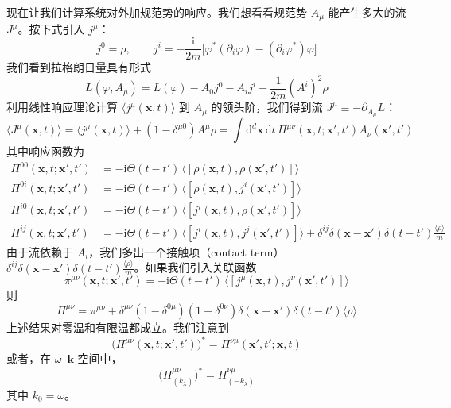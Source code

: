 现在让我们计算系统对外加规范势的响应。我们想看看规范势 $A_\mu$ 能产生多大的流 $J^\mu$。按下式引入 $j^\mu$：
\begin{equation*}
j^0=\rho,\qquad j^i=-\frac{\mathrm{i}}{2m}\big[\varphi^*(\partial_i\varphi)-(\partial_i\varphi^*)\varphi\big]
\end{equation*}
我们看到拉格朗日量具有形式
\begin{equation*}
L(\varphi,A_\mu)=L(\varphi)-A_0j^0-A_ij^i-\frac{1}{2m}(A^i)^2\rho
\end{equation*}
利用线性响应理论计算 $\langle j^\mu(\pmb{x},t)\rangle$ 到 $A_\mu$ 的领头阶，我们得到流 $J^\mu\equiv-\partial_{A_\mu}L$：
\begin{equation*}
\langle J^\mu(\pmb{x},t)\rangle=\langle j^\mu(\pmb{x},t)\rangle+(1-\delta^{\mu0})A^\mu\rho=\int\mathrm{d}^d\pmb{x}\,\mathrm{d}t\,\Pi^{\mu\nu}(\pmb{x},t;\pmb{x}',t')A_\nu(\pmb{x}',t')
\end{equation*}
其中响应函数为
\begin{align*}
\Pi^{00}(\pmb{x},t;\pmb{x}',t')&=-\mathrm{i}\Theta(t-t')\,\big\langle[\rho(\pmb{x},t),\rho(\pmb{x}',t')]\big\rangle\\
\Pi^{0i}(\pmb{x},t;\pmb{x}',t')&=-\mathrm{i}\Theta(t-t')\,\big\langle[\rho(\pmb{x},t),j^i(\pmb{x}',t')]\big\rangle\\
\Pi^{i0}(\pmb{x},t;\pmb{x}',t')&=-\mathrm{i}\Theta(t-t')\,\big\langle[j^i(\pmb{x},t),\rho(\pmb{x}',t')]\big\rangle\\
\Pi^{ij}(\pmb{x},t;\pmb{x}',t')&=-\mathrm{i}\Theta(t-t')\,\big\langle[j^i(\pmb{x},t),j^j(\pmb{x}',t')]\big\rangle+\delta^{ij}\delta(\pmb{x}-\pmb{x}')\delta(t-t')\frac{\langle\rho\rangle}{m}
\end{align*}
由于流依赖于 $A_i$，我们多出一个接触项（contact term）$\delta^{ij}\delta(\pmb{x}-\pmb{x}')\delta(t-t')\frac{\langle\rho\rangle}{m}$。如果我们引入关联函数
\begin{equation*}
\pi^{\mu\nu}(\pmb{x},t;\pmb{x}',t')=-\mathrm{i}\Theta(t-t')\,\big\langle[j^\mu(\pmb{x},t),j^\nu(\pmb{x}',t')]\big\rangle
\end{equation*}
则
\begin{equation*}
\Pi^{\mu\nu}=\pi^{\mu\nu}+\delta^{\mu\nu}(1-\delta^{0\mu})(1-\delta^{0\nu})\delta(\pmb{x}-\pmb{x}')\delta(t-t')\langle\rho\rangle \tag{3.7.6}
\end{equation*}
上述结果对零温和有限温都成立。我们注意到
\begin{equation*}
\big(\Pi^{\mu\nu}(\pmb{x},t;\pmb{x}',t')\big)^*=\Pi^{\nu\mu}(\pmb{x}',t';\pmb{x},t)
\end{equation*}
或者，在 $\omega$--$\pmb{k}$ 空间中，
\begin{equation*}
\big(\Pi^{\mu\nu}_{(k_\lambda)}\big)^*=\Pi^{\nu\mu}_{(-k_\lambda)}
\end{equation*}
其中 $k_0=\omega$。

